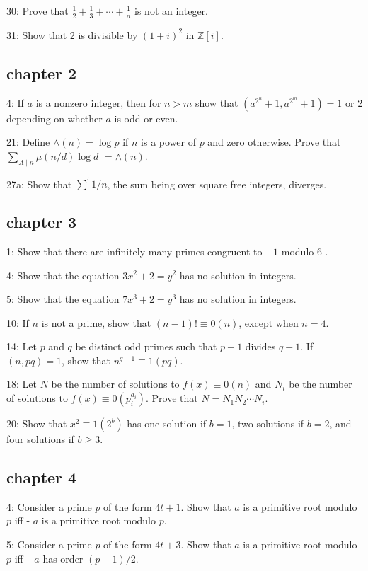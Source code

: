 \documentclass{article}
\begin{document}
30: Prove that $\frac{1}{2}+\frac{1}{3}+\cdots+\frac{1}{n}$ is not an integer.

31: Show that 2 is divisible by $(1+i)^{2}$ in $\mathbb{Z}[i]$.

\subsection*{chapter 2}
4: If $a$ is a nonzero integer, then for $n>m$ show that $\left(a^{2^{n}}+1, a^{2^{m}}+1\right)=1$ or 2 depending on whether $a$ is odd or even. 

21: Define $\wedge(n)=\log p$ if $n$ is a power of $p$ and zero otherwise. Prove that $\sum_{A \mid n} \mu(n / d) \log d$ $=\wedge(n)$.

27a: Show that $\sum^{\prime} 1 / n$, the sum being over square free integers, diverges.

\subsection*{chapter 3}
1: Show that there are infinitely many primes congruent to $-1$ modulo 6 .

4: Show that the equation $3 x^{2}+2=y^{2}$ has no solution in integers.

5: Show that the equation $7 x^{3}+2=y^{3}$ has no solution in integers.

10: If $n$ is not a prime, show that $(n-1) ! \equiv 0(n)$, except when $n=4$.

14: Let $p$ and $q$ be distinct odd primes such that $p-1$ divides $q-1$. If $(n, p q)=1$, show that $n^{q-1} \equiv 1(p q)$.

18: Let $N$ be the number of solutions to $f(x) \equiv 0(n)$ and $N_{i}$ be the number of solutions to $f(x) \equiv 0\left(p_{i}^{a_{i}}\right)$. Prove that $N=N_{1} N_{2} \cdots N_{i}$.

20: Show that $x^{2} \equiv 1\left(2^{b}\right)$ has one solution if $b=1$, two solutions if $b=2$, and four solutions if $b \geq 3$.

\subsection*{chapter 4}
4: Consider a prime $p$ of the form $4 t+1$. Show that $a$ is a primitive root modulo $p$ iff - $a$ is a primitive root modulo $p$.

5: Consider a prime $p$ of the form $4 t+3$. Show that $a$ is a primitive root modulo $p$ iff $-a$ has order $(p-1) / 2$.
\end{document}
